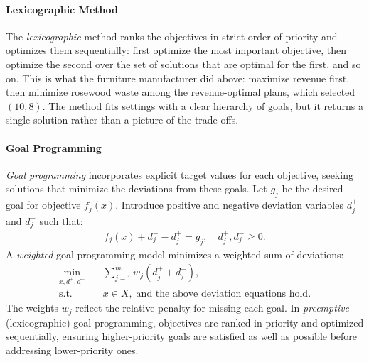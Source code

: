 \paragraph{Lexicographic Method}
The \emph{lexicographic} method ranks the objectives in strict order of priority and optimizes them sequentially: first optimize the most important objective, then optimize the second over the set of solutions that are optimal for the first, and so on. This is what the furniture manufacturer did above: maximize revenue first, then minimize rosewood waste among the revenue-optimal plans, which selected $(10,8)$. The method fits settings with a clear hierarchy of goals, but it returns a single solution rather than a picture of the trade-offs.

\paragraph{Goal Programming}
\emph{Goal programming} incorporates explicit target values for each objective, seeking solutions that minimize the deviations from these goals. Let $g_j$ be the desired goal for objective $f_j(x)$. Introduce positive and negative deviation variables $d_j^+$ and $d_j^-$ such that:
\begin{align*}
f_j(x) + d_j^- - d_j^+ = g_j, \quad d_j^+, d_j^- \ge 0.
\end{align*}
A \emph{weighted} goal programming model minimizes a weighted sum of deviations:
\begin{align*}
\min_{x, d^+, d^-} \quad & \sum_{j=1}^m w_j (d_j^+ + d_j^-), \\
\text{s.t.} \quad & x \in X, \; \text{and the above deviation equations hold.}
\end{align*}
The weights $w_j$ reflect the relative penalty for missing each goal. 
In \emph{preemptive} (lexicographic) goal programming, objectives are ranked in priority and optimized sequentially, ensuring higher-priority goals are satisfied as well as possible before addressing lower-priority ones.

